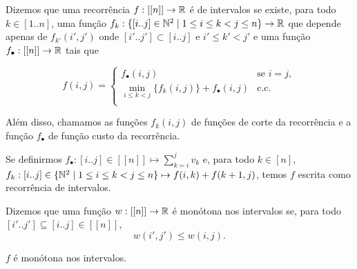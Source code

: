 \begin{defi} \label{rec_int}
Dizemos que uma recorrência $f : [[n]] \to \mathbb{R}$ é de intervalos se existe, para todo $k \in [1..n]$, uma função $f_k : \{[i..j] \in \mathbb{N}^2 \mid 1 \leq i \leq k < j \leq n \} \to \mathbb{R}$ que depende apenas de $f_{k'}(i',j')$ onde $[i'..j'] \subset [i..j]$ e $i' \leq k' < j'$ e uma função $f_\bullet : [[n]] \to \mathbb{R}$ tais que

$$
f(i,j) = \begin{cases}
    f_\bullet (i,j) & \text{se } i = j, \\
    \min\limits_{i \leq k < j} \Big\{ f_k(i,j) \Big\} + f_\bullet (i,j) & \text{c.c.} \\
\end{cases}
$$

Além disso, chamamos as funções $f_k(i,j)$ de funções de corte da recorrência e a função $f_\bullet$ de função custo da recorrência.
\end{defi}

Se definirmos $f_\bullet : [i..j] \in [[n]] \mapsto \sum\limits_{k=i}^j v_k$ e, para todo $k \in [n]$, $f_k : [i..j] \in \{ \mathbb{N}^2 \mid 1 \leq i \leq k < j \leq n \} \mapsto f(i,k) + f(k+1,j)$, temos $f$ escrita como recorrência de intervalos.

\begin{defi} \label{mon_int}
Dizemos que uma função $w : [[n]] \to \mathbb{R}$ é monótona nos intervalos se, para todo $[i'..j'] \subseteq [i..j] \in [[n]]$,
$$ w(i',j') \leq w(i,j). $$
\end{defi}

\begin{prop}
$f$ é monótona nos intervalos.
\end{prop}

